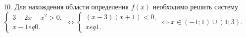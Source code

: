 10. Для нахождения области определения $f(x)$ необходимо решить систему $\begin{cases} 3+2x-x^2>0,\\ x-1
eq0.\end{cases}\Leftrightarrow
\begin{cases} (x-3)(x+1)<0,\\ x
eq1.\end{cases}\Leftrightarrow x\in(-1;1)\cup(1;3).$\\
